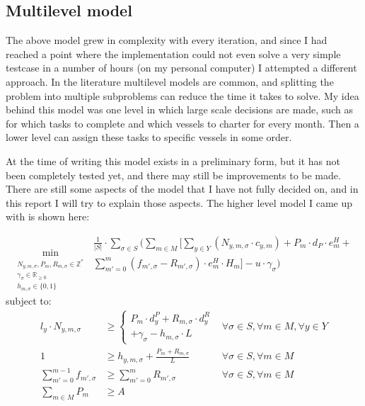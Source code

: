 \documentclass[a4paper,12pt]{article}
\begin{document}
\subsection{Multilevel model} \label{ss:multi}
The above model grew in complexity with every iteration, and since I had reached a point where the implementation could not even solve a very simple testcase in a number of hours (on my personal computer) I attempted a different approach. In the literature multilevel models are common, and splitting the problem into multiple subproblems can reduce the time it takes to solve. My idea behind this model was one level in which large scale decisions are made, such as for which tasks to complete and which vessels to charter for every month. Then a lower level can assign these tasks to specific vessels in some order. 

At the time of writing this model exists in a preliminary form, but it has not been completely tested yet, and there may still be improvements to be made. There are still some aspects of the model that I have not fully decided on, and in this report I will try to explain those aspects. The higher level model I came up with is shown here:

\begin{equation}
	\min_{\substack{N_{y,m,\sigma}, P_m, R_{m,\sigma} \in \mathbb{Z}^* \\
	\gamma_\sigma \in \mathbb{R}_{\geq 0} \\
	h_{m,\sigma} \in \{0, 1\} }}
	\begin{aligned}
	\frac{1}{|S|} \cdot \sum_{\sigma \in S} ( \sum_{m \in M} [\sum_{y \in Y} 
	(N_{y,m,\sigma} \cdot c_{y,m}) +  
	P_m \cdot d_P \cdot e^H_m + \\
	\sum_{m' = 0}^{m} (f_{m',\sigma} - R_{m',\sigma}) \cdot e^H_m \cdot H_m ]
	- u \cdot \gamma_\sigma)
	\end{aligned}	
\end{equation}
subject to:
\begin{align}
l_y \cdot N_{y,m,\sigma} 			&\geq 	\begin{cases} P_m \cdot d^P_y + R_{m,\sigma} \cdot d^R_y \\
								+ \gamma_\sigma - h_{m,\sigma} \cdot L \end{cases}
																				& \forall \sigma \in S, \forall m \in M, \forall y \in Y 	\\
1 						&\geq		h_{y,m,\sigma} + \frac{P_m + R_{m,\sigma}}{L}					& \forall \sigma \in S, \forall m \in M 		 	\\
\sum_{m' = 0}^{m-1} f_{m',\sigma}	&\geq 	\sum_{m' = 0}^m R_{m',\sigma}								& \forall \sigma \in S, \forall m \in M			\\
\sum_{m\in M} P_m 			&\geq 	A 												&						
\end{align}
\end{document}
